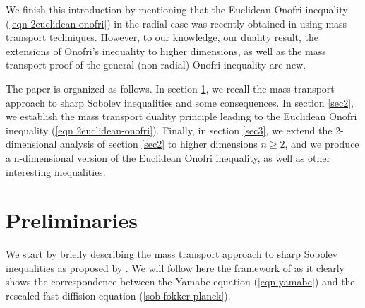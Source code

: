 \documentclass[10pt]{article}
\numberwithin{equation}{section}
\theoremstyle{plain}
\theoremstyle{definition}
\theoremstyle{remark}
\begin{document}
\smallskip

We finish this introduction by mentioning that the Euclidean Onofri inequality (\ref{eqn 2euclidean-onofri}) in the radial case was recently obtained in \cite{DEJ} using mass transport techniques. However,  to our knowledge, our duality result, the extensions of Onofri's inequality to higher dimensions, as well as the mass transport proof of the general (non-radial) Onofri inequality are new.


\smallskip 

The paper is organized as follows. In section \ref{sec1}, we recall the mass transport approach to sharp Sobolev inequalities and some consequences. In section \ref{sec2}, we establish the mass transport duality principle leading to the Euclidean Onofri inequality (\ref{eqn 2euclidean-onofri}). Finally, in section \ref{sec3}, we extend the 2-dimensional analysis of section \ref{sec2} to higher dimensions $n\geq 2$, and we produce a n-dimensional version of the Euclidean Onofri inequality, as well as other interesting inequalities.



\section{Preliminaries} \label{sec1}
We start by briefly describing the mass transport approach to sharp Sobolev inequalities as proposed by \cite{CNV}. We will follow here the framework of \cite{AGK} as it clearly shows the correspondence between the Yamabe equation (\ref{eqn yamabe}) and the rescaled fast diffision equation (\ref{sob-fokker-planck}).
\end{document}
